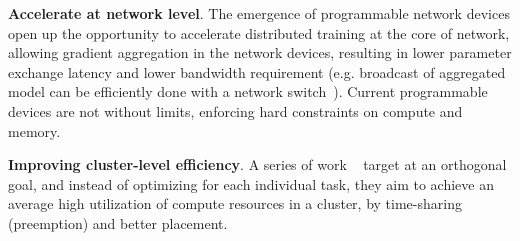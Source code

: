 \noindent\textbf{Accelerate at network level}. The emergence of programmable network devices open up the opportunity to accelerate distributed training at the core of network, allowing gradient aggregation in the network devices, resulting in lower parameter exchange latency and lower bandwidth requirement (e.g. broadcast of aggregated model can be efficiently done with a network switch~\cite{sapio2019scaling,luomotivating}). Current programmable devices are not without limits, enforcing hard constraints on compute and memory.

\noindent\textbf{Improving cluster-level efficiency}. A series of work ~\cite{222611,Shen2018NexusA} target at an orthogonal goal, and instead of optimizing for each individual task, they aim to achieve an average high utilization of compute resources in a cluster, by time-sharing (preemption) and better placement.


